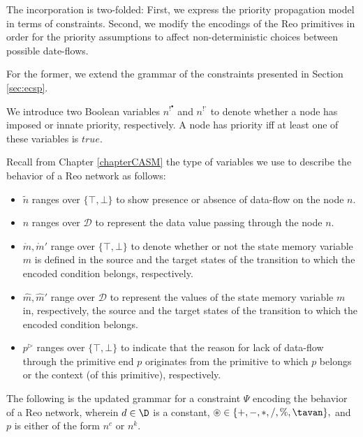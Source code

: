 The incorporation is two-folded: First, we express the priority propagation model in terms of constraints. Second, we modify the encodings of the Reo primitives  
in order for the priority assumptions to affect  non-deterministic choices between possible date-flows.

For the former, we extend the grammar of the constraints %
 presented in Section \ref{sec:ecsp}. %

We introduce two Boolean variables $n^{!^\bullet}$ and $n^{!^\circ}$ to denote whether a node has imposed or innate priority, respectively. A node has priority iff at least one of these variables is $true$.

Recall from Chapter \ref{chapterCASM} the type of variables we use to describe the behavior of a Reo network as follows: 

\begin{itemize}
 \item $\tilde{n}$ ranges over $\{ \top, \bot \}$ to show presence or absence of data-flow on the node $n$.
 \item $\hat{n}$ ranges over $\mathcal{D}$ to represent the data value passing through the node $n$.
 \item $\mathring{m}, \mathring{m}'$ range over $\{ \top, \bot \}$ to denote whether or not the state memory variable $m$ is defined in the source and the target states of the transition to which the encoded condition belongs, respectively.
 \item $\hat{m}, \hat{m}'$ range over $\mathcal{D}$ to represent the values of the state memory variable $m$ in, respectively, the source and the target states of the transition to which the encoded condition belongs.
 \item $p^\triangleright$ ranges over $\{ \top, \bot \}$ to indicate that the reason for lack of data-flow through the primitive end $p$ originates from the primitive to which $p$ belongs or the context (of this primitive), respectively.
\end{itemize}

The following is the updated grammar for a constraint $\Psi$ encoding the behavior of a Reo network, wherein
$d \in \D$ is a constant, $\circledast \in \{+, -, \ast, /, \%, \tavan \}, $ and $p$ is  either of the form $n^c$ or $n^k$.


